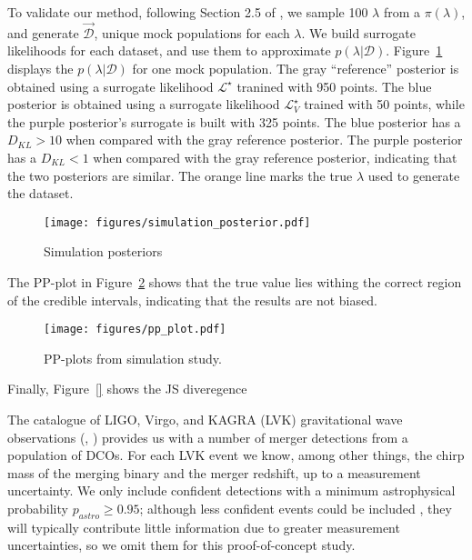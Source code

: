 \documentclass[twocolumn]{aastex631}
\newcommand\COMPAS{{\sc{COMPAS}}\xspace}
\begin{document}
To validate our method, following Section 2.5 of \citep{}, we sample 100 $\lambda$ from a $\pi(\lambda)$, and generate $\vec{\mathcal{D}}$, unique mock \COMPAS populations for each $\lambda$.
We build surrogate likelihoods for each dataset, and use them to approximate $p(\lambda|\mathcal{D})$.
Figure~\ref{fig:simulation_posterior} displays the $p(\lambda|\mathcal{D})$ for one mock population.
The gray ``reference'' posterior is obtained using a surrogate likelihood $\mathcal{L}^{\star}$ tranined with 950 points.
The blue posterior is obtained using a surrogate likelihood $\mathcal{L}^{\star}_V$ trained with 50 points, while the purple posterior's surrogate is built with 325 points. 
The blue posterior has a $D_{KL}>10$ when compared with the gray reference posterior. 
The purple  posterior has a $D_{KL}<1$ when compared with the gray reference posterior, indicating that the two posteriors are similar. 
The orange line marks the true $\lambda$ used to generate the dataset. 
\begin{figure}[ht!]
    \begin{centering}
        \texttt{[image: figures/simulation\_posterior.pdf]}
        \caption{
            Simulation posteriors
        }
        \label{fig:simulation_posterior}
    \end{centering}
\end{figure}


The PP-plot in Figure~\ref{fig:pp_plot} shows that the true value lies withing the correct region of the credible intervals, indicating that the results are not biased.
\begin{figure}[ht!]
    \begin{centering}
        \texttt{[image: figures/pp\_plot.pdf]}
        \caption{
            PP-plots from simulation study.
        }
        \label{fig:pp_plot}
    \end{centering}
\end{figure}


Finally, Figure~\ref{} shows the JS diveregence 



The catalogue of LIGO, Virgo, and KAGRA (LVK) gravitational wave observations (\citet{GWTC-2_1_zenodo}, \citet{GWTC-3_zenodo}) provides us with a number of merger detections from a population of \acp{DCO}.  For each LVK event we know, among other things, the chirp mass of the merging binary and the merger redshift, up to a measurement uncertainty. We only include confident detections with a minimum astrophysical probability $p_{astro} \ge 0.95$; although less confident events could be included \citep[e.g.][]{Farr_2015}, they will typically contribute little information due to greater measurement uncertainties, so we omit them for this proof-of-concept study.
\end{document}
